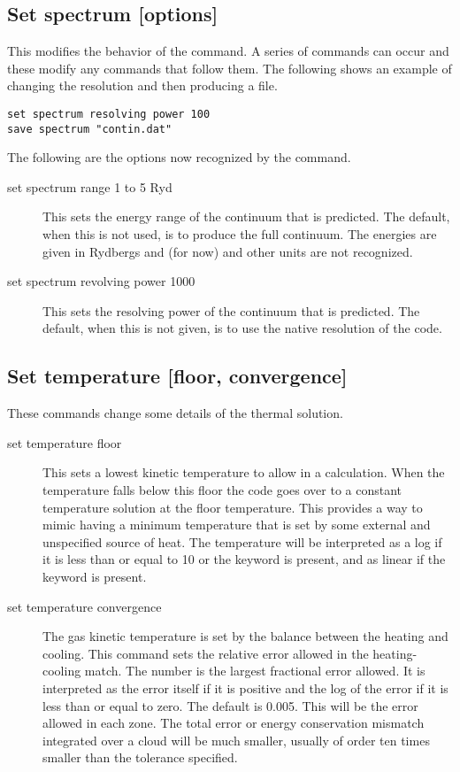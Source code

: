 \begin{shaded}
\subsection{\experimental Set spectrum  [options]}

This modifies the behavior of the  command.
A series of  commands can occur
and these modify any  commands
that follow them.
The following shows an example of
changing the resolution and then producing
a  file.
\begin{verbatim}
set spectrum resolving power 100
save spectrum "contin.dat"
\end{verbatim}

The following are the options now recognized by the
 command.
\begin{description}
\item[set spectrum range 1 to 5 Ryd]  This sets the energy range
of the continuum
that is predicted.
The default, when this is not used, is to produce the
full continuum.
The energies are given in Rydbergs and (for now) and other
units are not recognized.

\item[set spectrum revolving power 1000]  This sets the
resolving power of the
continuum that is predicted.
The default, when this is not given, is to
use the native resolution of the code.
\end{description}
\end{shaded}

\subsection{Set temperature [floor, convergence]}

These commands change some details of the thermal solution.
\begin{description}
\item[set temperature floor]  This sets a lowest kinetic temperature
to allow in a calculation.
When the temperature falls below this floor the code
goes over to a constant temperature solution at the floor temperature.
This provides a way to mimic having a minimum temperature that
is set by some external and unspecified source of heat.
The temperature will be interpreted as a log if it is less than
or equal to 10 or the keyword  is present, and as
linear if the keyword  is present.

\item[set temperature convergence]  The gas kinetic temperature
is set by the balance
between the heating and cooling.
This command sets the relative error
allowed in the heating-cooling match.
The number is the largest fractional
error allowed.
It is interpreted as the error itself if it is positive
and the log of the error if it is less than or equal to zero.
The default is 0.005.
This will be the error allowed in each zone.
The total error
or energy conservation mismatch integrated over a cloud will be much smaller,
usually of order ten times smaller than the tolerance specified.
\end{description}

